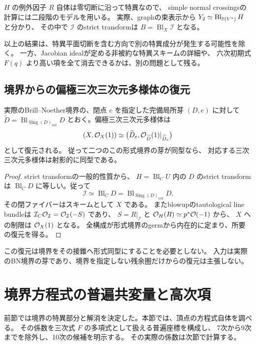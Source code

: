 $H$ の例外因子 $R$ 自体は零切断に沿って特異なので、
simple normal crossingsの計算には二段階のモデルを用いる。
実際、graphの束表示から $Y_2\simeq\operatorname{Bl}_{\mathbb P(V^*)}H$ と分かり、
その中で $\mathcal I$ のstrict transformは $B=\operatorname{Bl}_X\mathcal I$ となる。

以上の結果は、特異平面切断を含む方向で別の特異成分が発生する可能性を除く。
一方、Jacobian idealが定める非被約な特異スキームの詳細や、
六次初期式 $F(q)$ より高い項を全て消去できるかは、別の問題として残る。


\subsection{境界からの偏極三次三次元多様体の復元}

\begin{theorem}[内在的なblowupによる復元]\label{thm:bn-intrinsic-reconstruction}
実際のBrill--Noether境界の、閉点 $e$ を指定した完備局所芽 $(D,e)$ に対して
$\widetilde D=\operatorname{Bl}_{\operatorname{Sing}(D)_{\mathrm{red}}}D$
とおく。偏極三次三次元多様体は
\[
 (X,\mathcal O_X(1))
 \simeq\bigl(\widetilde D_e,\mathcal O_{\widetilde D}(1)|_{\widetilde D_e}\bigr)
\]
として復元される。
従って二つのこの形式境界の芽が同型なら、
対応する三次三次元多様体は射影的に同型である。
\end{theorem}

\begin{proof}
strict transformの一般的性質\cite{StacksStrictTransform}から、
$H=\operatorname{Bl}_C U$ 内の $D$ のstrict transformは
$\operatorname{Bl}_C D$ に等しい。従って
\[
 \mathcal I\simeq\operatorname{Bl}_C D
 =\operatorname{Bl}_{\operatorname{Sing}(D)_{\mathrm{red}}}D.
\]
その閉ファイバーはスキームとして $X$ である。
またblowupのtautological line bundleは
$\mathcal I_C\mathcal O_{\mathcal I}=\mathcal O_{\mathcal I}(-S)$ であり、
$S=R|_{\mathcal I}$ と $\mathcal O_H(R)\simeq p^*\mathcal O(-1)$ から、
$X$ への制限は $\mathcal O_X(1)$ となる。
全構成が形式境界のgermから内在的に定まり、所要の復元を得る。
\end{proof}

この復元は境界をその接錐へ形式同型にすることを必要としない。
入力は実際のBN境界の芽であり、境界を指定しない残余圏だけからの復元は主張しない。


\section{境界方程式の普遍共変量と高次項}
\label{sec:boundary-higher-jets}

前節では境界の特異部分と解消を決定した。本節では、頂点の方程式自体を調べる。
その係数を三次式 $F$ の多項式として扱える普遍座標を構成し、
7次から9次までを除外し、10次の候補を明示する。
その実際の係数は次節で計算する。

